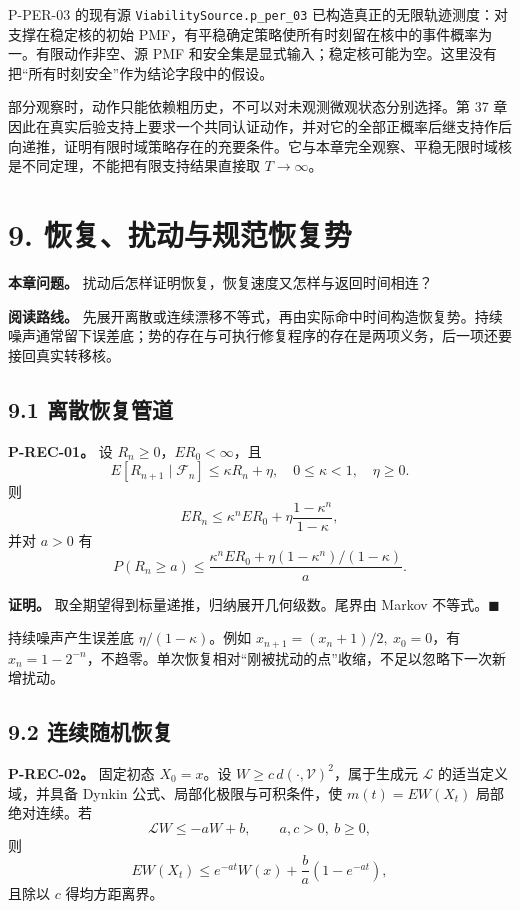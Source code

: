 \documentclass[
  11pt,
  oneside]{book}
\begin{document}
P-PER-03 的现有源 \nolinkurl{ViabilitySource.p_per_03} 已构造真正的无限轨迹测度：对支撑在稳定核的初始 PMF，有平稳确定策略使所有时刻留在核中的事件概率为一。有限动作非空、源 PMF 和安全集是显式输入；稳定核可能为空。这里没有把``所有时刻安全''作为结论字段中的假设。

部分观察时，动作只能依赖粗历史，不可以对未观测微观状态分别选择。第 37 章因此在真实后验支持上要求一个共同认证动作，并对它的全部正概率后继支持作后向递推，证明有限时域策略存在的充要条件。它与本章完全观察、平稳无限时域核是不同定理，不能把有限支持结果直接取 \(T\to\infty\)。

\chapter{9. 恢复、扰动与规范恢复势}\label{ch-9}

\textbf{本章问题。} 扰动后怎样证明恢复，恢复速度又怎样与返回时间相连？

\textbf{阅读路线。} 先展开离散或连续漂移不等式，再由实际命中时间构造恢复势。持续噪声通常留下误差底；势的存在与可执行修复程序的存在是两项义务，后一项还要接回真实转移核。

\section{9.1 离散恢复管道}\label{ux79bbux6563ux6062ux590dux7ba1ux9053}

\hypertarget{p-rec-01}{}\label{p-rec-01}

\textbf{P-REC-01。} 设 \(R_n\ge0\)，\(ER_0<\infty\)，且 \[E[R_{n+1}\mid\mathcal F_n]\le\kappa R_n+\eta,
\quad0\le\kappa<1,\quad\eta\ge0.\] 则 \[ER_n\le\kappa^nER_0+\eta\frac{1-\kappa^n}{1-\kappa},\] 并对 \(a>0\) 有 \[P(R_n\ge a)\le
\frac{\kappa^nER_0+\eta(1-\kappa^n)/(1-\kappa)}a.\]

\textbf{证明。} 取全期望得到标量递推，归纳展开几何级数。尾界由 Markov 不等式。\(\blacksquare\)

持续噪声产生误差底 \(\eta/(1-\kappa)\)。例如 \(x_{n+1}=(x_n+1)/2,\ x_0=0\)，有 \(x_n=1-2^{-n}\)，不趋零。单次恢复相对``刚被扰动的点''收缩，不足以忽略下一次新增扰动。

\section{9.2 连续随机恢复}\label{ux8fdeux7eedux968fux673aux6062ux590d}

\hypertarget{p-rec-02}{}\label{p-rec-02}

\textbf{P-REC-02。} 固定初态 \(X_0=x\)。设 \(W\ge c\,d(\cdot,\mathcal V)^2\)，属于生成元 \(\mathcal L\) 的适当定义域，并具备 Dynkin 公式、局部化极限与可积条件，使 \(m(t)=EW(X_t)\) 局部绝对连续。若 \[\mathcal LW\le-aW+b,\qquad a,c>0,\ b\ge0,\] 则 \[EW(X_t)\le e^{-at}W(x)+\frac ba(1-e^{-at}),\] 且除以 \(c\) 得均方距离界。
\end{document}
